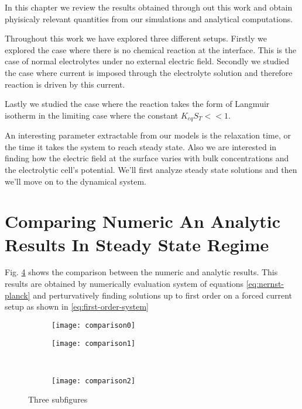 In this chapter we review the results obtained through out this work and obtain phyisicaly relevant quantities from our simulations and analytical computations. 

Throughout this work we have explored three different setups. Firstly we explored the case where there is no chemical reaction at the interface. This is the case of normal electrolytes under no external electric field. Secondly we studied the case where current is imposed through the electrolyte solution and therefore reaction is driven by this current. 

Lastly we studied the case where the reaction takes the form of Langmuir isotherm in the limiting case where the constant $K_{eq}S_T << 1$. 

An interesting parameter extractable from our models is the relaxation time, or the time it takes the system to reach steady state. Also we are interested in finding how the electric field at the surface varies with bulk concentrations and the electrolytic cell's potential.  We'll first analyze steady state solutions and then we'll move on to the dynamical system.



\section{Comparing Numeric An Analytic Results In Steady State Regime}

Fig. \ref{fig:comparison} shows the comparison between the numeric and analytic results. This results are obtained by numerically evaluation system of equations \ref{eq:nernst-planck} and perturvatively finding solutions up to first order on a forced current setup as shown in \ref{eq:first-order-system}



\begin{figure}[htbp]
\begin{subfigure}{.5\linewidth}
\centering
\texttt{[image: comparison0]}
\caption{}
\label{fig:sub1}
\end{subfigure}%
\begin{subfigure}{.5\linewidth}
\centering
\texttt{[image: comparison1]}
\caption{}
\label{fig:sub2}
\end{subfigure}\\[1ex]
\begin{subfigure}{\linewidth}
\centering
\texttt{[image: comparison2]}
\caption{}
\label{fig:sub3}
\end{subfigure}
\caption{Three subfigures}
\label{fig:comparison}
\end{figure}



